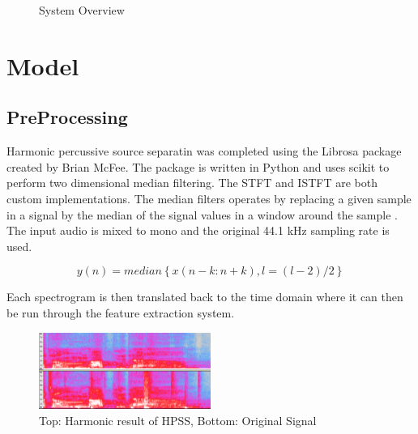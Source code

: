 \documentclass{article}
\begin{document}
\begin{figure}
\caption{System Overview}
\label{fig:overview}
\end{figure}

\section{Model}

\subsection{PreProcessing}
Harmonic percussive source separatin was completed using the Librosa package created by Brian McFee.
The package is written in Python and uses scikit to perform two dimensional median filtering. The
STFT and ISTFT are both custom implementations. The median filters operates by replacing a given sample
in a signal by the median of the signal values in a window around the sample \cite{FitzGerald:11}. The input
audio is mixed to mono and the original 44.1 kHz sampling rate is used. 

$$y(n) = median \left \{x(n-k:n+k),l = (l-2)/2  \right \}$$

Each spectrogram is then translated back to the time domain where it can then be run through the
feature extraction system.

\begin{figure}
   \centering
    \includegraphics[width=0.5\textwidth]{hpssspec.png}
   \caption{Top: Harmonic result of HPSS, Bottom: Original Signal}
   \label{fig:HPSS}
\end{figure}
\end{document}
